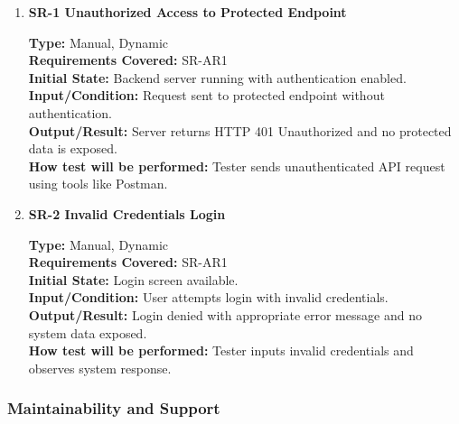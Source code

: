 \documentclass[12pt, titlepage]{article}
\begin{document}
\begin{enumerate}

\item \textbf{SR-1 Unauthorized Access to Protected Endpoint}

\textbf{Type:} Manual, Dynamic \\
\textbf{Requirements Covered:} SR-AR1\\
\textbf{Initial State:} Backend server running with authentication enabled. \\
\textbf{Input/Condition:} Request sent to protected endpoint without authentication. \\
\textbf{Output/Result:} Server returns HTTP 401 Unauthorized and no protected data is exposed. \\
\textbf{How test will be performed:} Tester sends unauthenticated API request using tools like Postman. \\

\vspace{0.5em}

\item \textbf{SR-2 Invalid Credentials Login}

\textbf{Type:} Manual, Dynamic \\
\textbf{Requirements Covered:} SR-AR1\\
\textbf{Initial State:} Login screen available. \\
\textbf{Input/Condition:} User attempts login with invalid credentials. \\
\textbf{Output/Result:} Login denied with appropriate error message and no system data exposed. \\
\textbf{How test will be performed:} Tester inputs invalid credentials and observes system response. \\

\end{enumerate}

\subsubsection{Maintainability and Support}
\end{document}
